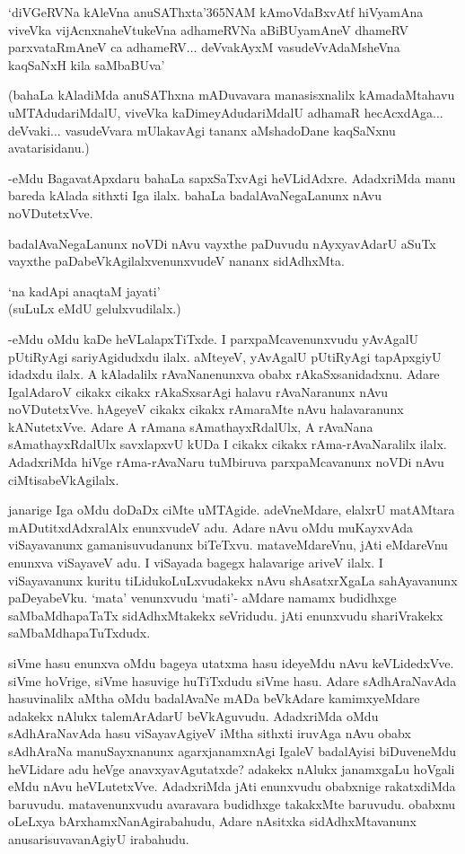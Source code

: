 \begin{shloka}
`diVGeRVNa kAleVna anuSAThxta\char'365NAM kAmoVdaBxvAtf hiVyamAna\\
viveVka vijAcnxnaheVtukeVna adhameRVNa aBiBUyamAneV dhameRV\\
parxvataRmAneV ca adhameRV$\ldots$ deVvakAyxM vasudeVvAdaMsheVna kaqSaNxH kila saMbaBUva'
\end{shloka}

(bahaLa kAladiMda anuSAThxna mADuvavara manasisxnalilx kAmadaMtahavu uMTAdudariMdalU, viveVka kaDimeyAdudariMdalU adhamaR hecAcxdAga$\ldots$ deVvaki$\ldots$ vasudeVvara mUlakavAgi tananx aMshadoDane kaqSaNxnu avatarisidanu.)

-eMdu BagavatApxdaru bahaLa sapxSaTxvAgi heVLidAdxre. AdadxriMda manu bareda kAlada sithxti Iga ilalx. bahaLa badalAvaNegaLanunx nAvu noVDutetxVve.

badalAvaNegaLanunx noVDi nAvu vayxthe paDuvudu nAyxyavAdarU aSuTx vayxthe paDabeVkAgilalxvenunxvudeV nananx sidAdhxMta.

\begin{shloka}
`na kadApi anaqtaM jayati'\\
(suLuLx eMdU gelulxvudilalx.)
\end{shloka}

-eMdu oMdu kaDe heVLalapxTiTxde. I parxpaMcavenunxvudu yAvAgalU pUtiRyAgi sariyAgidudxdu ilalx. aMteyeV, yAvAgalU pUtiRyAgi tapApxgiyU idadxdu ilalx. A kAladalilx rAvaNanenunxva obabx rAkaSxsanidadxnu. Adare IgalAdaroV cikakx cikakx rAkaSxsarAgi halavu rAvaNaranunx nAvu noVDutetxVve. hAgeyeV cikakx cikakx rAmaraMte nAvu halavaranunx kANutetxVve. Adare A rAmana sAmathayxRdalUlx, A rAvaNana sAmathayxRdalUlx savxlapxvU kUDa I cikakx cikakx rAma-rAvaNaralilx ilalx. AdadxriMda hiVge rAma-rAvaNaru tuMbiruva parxpaMcavanunx noVDi nAvu ciMtisabeVkAgilalx.

janarige Iga oMdu doDaDx ciMte uMTAgide. adeVneMdare, elalxrU matAMtara mADutitxdAdxralAlx enunxvudeV adu. Adare nAvu oMdu muKayxvAda viSayavanunx gamanisuvudanunx biTeTxvu. mataveMdareVnu, jAti eMdareVnu enunxva viSayaveV adu. I viSayada bagegx halavarige ariveV ilalx. I viSayavanunx kuritu tiLidukoLuLxvudakekx nAvu shAsatxrXgaLa sahAyavanunx paDeyabeVku. `mata' venunxvudu `mati'- aMdare namamx budidhxge saMbaMdhapaTaTx sidAdhxMtakekx seVridudu. jAti enunxvudu shariVrakekx saMbaMdhapaTuTxdudx.

siVme hasu enunxva oMdu bageya utatxma hasu ideyeMdu nAvu keVLidedxVve. siVme hoVrige, siVme hasuvige huTiTxdudu siVme hasu. Adare sAdhAraNavAda hasuvinalilx aMtha oMdu badalAvaNe mADa beVkAdare kamimxyeMdare adakekx nAlukx talemArAdarU beVkAguvudu. AdadxriMda oMdu sAdhAraNavAda hasu viSayavAgiyeV iMtha sithxti iruvAga nAvu obabx sAdhAraNa manuSayxnanunx agarxjanamxnAgi IgaleV badalAyisi biDuveneMdu heVLidare adu heVge anavxyavAgutatxde? adakekx nAlukx janamxgaLu hoVgali eMdu nAvu heVLutetxVve. AdadxriMda jAti enunxvudu obabxnige rakatxdiMda baruvudu. matavenunxvudu avaravara budidhxge takakxMte baruvudu. obabxnu oLeLxya bArxhamxNanAgirabahudu, Adare nAsitxka sidAdhxMtavanunx anusarisuvavanAgiyU irabahudu.

